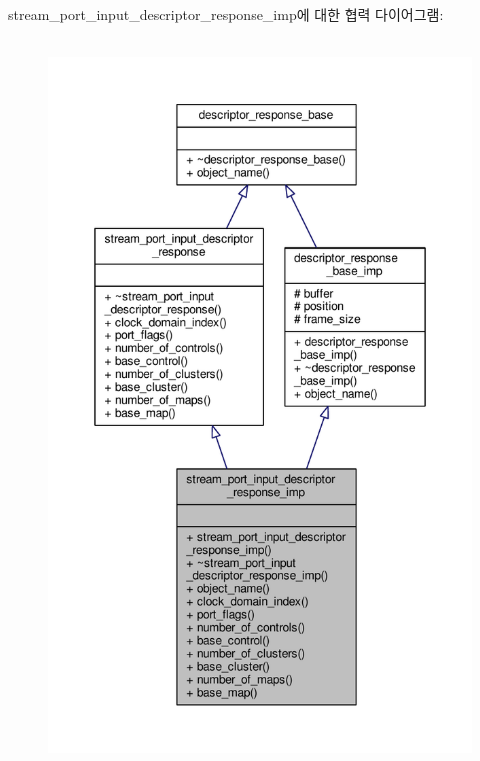 stream\+\_\+port\+\_\+input\+\_\+descriptor\+\_\+response\+\_\+imp에 대한 협력 다이어그램\+:
\nopagebreak
\begin{figure}[H]
\begin{center}
\leavevmode
\includegraphics[height=550pt]{classavdecc__lib_1_1stream__port__input__descriptor__response__imp__coll__graph}
\end{center}
\end{figure}
